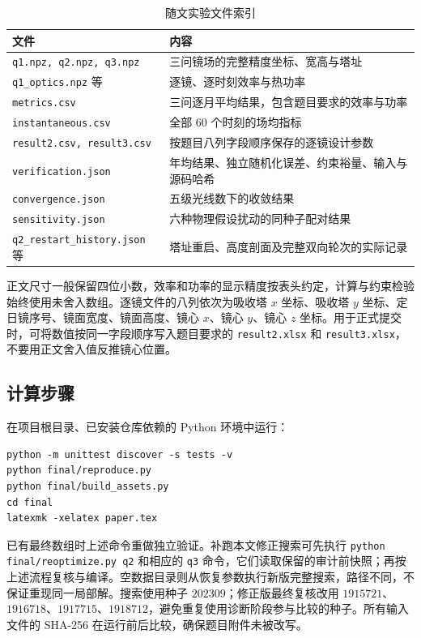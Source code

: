 \documentclass[UTF8,a4paper,zihao=-4,fontset=mac]{ctexart}
\begin{document}
\begin{table}[H]
\centering\small
\caption{随文实验文件索引}
\begin{tabular}{p{62mm}p{86mm}}
\toprule
文件 & 内容\\\midrule
\texttt{q1.npz, q2.npz, q3.npz} & 三问镜场的完整精度坐标、宽高与塔址\\
\texttt{q1\_optics.npz} 等 & 逐镜、逐时刻效率与热功率\\
\texttt{metrics.csv} & 三问逐月平均结果，包含题目要求的效率与功率\\
\texttt{instantaneous.csv} & 全部 $60$ 个时刻的场均指标\\
\texttt{result2.csv, result3.csv} & 按题目八列字段顺序保存的逐镜设计参数\\
\texttt{verification.json} & 年均结果、独立随机化误差、约束裕量、输入与源码哈希\\
\texttt{convergence.json} & 五级光线数下的收敛结果\\
\texttt{sensitivity.json} & 六种物理假设扰动的同种子配对结果\\
\texttt{q2\_restart\_history.json} 等 & 塔址重启、高度剖面及完整双向轮次的实际记录\\\bottomrule
\end{tabular}
\end{table}

正文尺寸一般保留四位小数，效率和功率的显示精度按表头约定，计算与约束检验始终使用未舍入数组。逐镜文件的八列依次为吸收塔 $x$ 坐标、吸收塔 $y$ 坐标、定日镜序号、镜面宽度、镜面高度、镜心 $x$、镜心 $y$、镜心 $z$ 坐标。用于正式提交时，可将数值按同一字段顺序写入题目要求的 \texttt{result2.xlsx} 和 \texttt{result3.xlsx}，不要用正文舍入值反推镜心位置。

\subsection{计算步骤}
在项目根目录、已安装仓库依赖的 Python 环境中运行：
\begin{verbatim}
python -m unittest discover -s tests -v
python final/reproduce.py
python final/build_assets.py
cd final
latexmk -xelatex paper.tex
\end{verbatim}
已有最终数组时上述命令重做独立验证。补跑本文修正搜索可先执行 \texttt{python final/reoptimize.py q2} 和相应的 \texttt{q3} 命令，它们读取保留的审计前快照；再按上述流程复核与编译。空数据目录则从恢复参数执行新版完整搜索，路径不同，不保证重现同一局部解。搜索使用种子 $202309$；修正版最终复核改用 $1915721$、$1916718$、$1917715$、$1918712$，避免重复使用诊断阶段参与比较的种子。所有输入文件的 SHA-256 在运行前后比较，确保题目附件未被改写。
\end{document}
